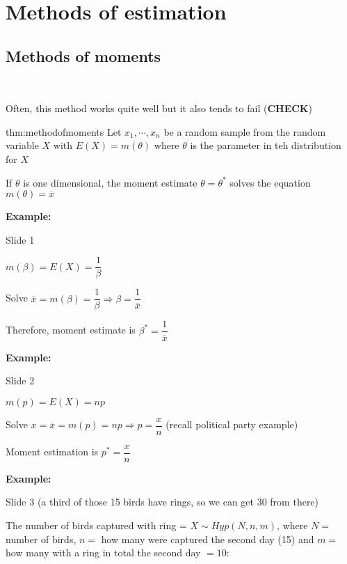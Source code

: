 \section{Methods of estimation}\par
\subsection{Methods of moments}\hfill\\\par
\noindent Often, this method works quite well but it also tends to fail (\textbf{CHECK})
\par\bigskip
\begin{theo}{thm:methodofmoments}
  Let $x_1,\cdots,x_n$ be a random sample from the random variable $X$ with $E(X) = m(\theta)$ where $\theta$ is the parameter in teh distribution for $X$
  \par\bigskip
  \noindent If $\theta$ is one dimensional, the moment estimate $\theta = \theta^*$ solves the equation $m(\theta) =\overline{x}$
\end{theo}
\par\bigskip
\noindent\textbf{Example:}\par
Slide 1
\par\bigskip
\noindent $m(\beta) = E(X) = \dfrac{1}{\beta}$\par
\noindent Solve $\overline{x} = m(\beta) = \dfrac{1}{\beta}\Rightarrow \beta = \dfrac{1}{\overline{x}}$
\par\bigskip
\noindent Therefore, moment estimate is $\beta^* = \dfrac{1}{\overline{x}}$
\par\bigskip
\noindent\textbf{Example:}\par
Slide 2
\par\bigskip
\noindent $m(p) = E(X) = np$\par
\noindent Solve $x = \overline{x} = m(p) = np\Rightarrow p = \dfrac{x}{n}$ (recall political party example)
\par\bigskip
\noindent Moment estimation is $p^* = \dfrac{x}{n}$
\par\bigskip
\noindent\textbf{Example:}\par
\noindent Slide 3 (a third of those 15 birds have rings, so we can get 30 from there)
\par\bigskip
\noindent The number of birds captured with ring = $X\sim Hyp(N,n,m)$, where $N = $ number of birds, $n = $ how many were captured the second day (15) and $m=$ how many with a ring in total the second day $ = 10$:
